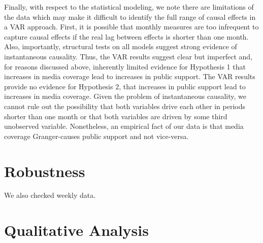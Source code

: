 \documentclass[12pt,]{article}
\begin{document}
Finally, with respect to the statistical modeling, we note there are
limitations of the data which may make it difficult to identify the full
range of causal effects in a VAR approach. First, it is possible that
monthly measures are too infrequent to capture causal effects if the
real lag between effects is shorter than one month. Also, importantly,
structural tests on all models suggest strong evidence of instantaneous
causality. Thus, the VAR results suggest clear but imperfect and, for
reasons discussed above, inherently limited evidence for Hypothesis 1
that increases in media coverage lead to increases in public support.
The VAR results provide no evidence for Hypothesis 2, that increases in
public support lead to increases in media coverage. Given the problem of
instantaneous causality, we cannot rule out the possibility that both
variables drive each other in periods shorter than one month or that
both variables are driven by some third unobserved variable.
Nonetheless, an empirical fact of our data is that media coverage
Granger-causes public support and not vice-versa.

\section{Robustness}\label{robustness}

We also checked weekly data.

\section{Qualitative Analysis}\label{qualitative-analysis}
\end{document}
